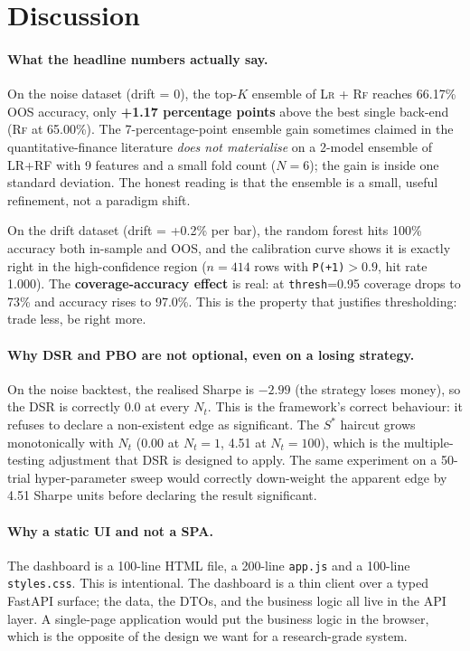 \documentclass[11pt,a4paper]{article}
\let\oldsection\section
\renewcommand{\section}{\clearpage\oldsection}
\providecommand{\rf}{\textsc{Rf}}
\providecommand{\lr}{\textsc{Lr}}
\providecommand{\srmin}{S^{\ast}}
\begin{document}
\section{Discussion}\label{sec:disc}

\paragraph{What the headline numbers actually say.}
On the noise dataset (drift = 0), the top-$K$ ensemble
of \lr{} + \rf{} reaches 66.17\% OOS accuracy, only
\textbf{+1.17 percentage points} above the best single
back-end (\rf{} at 65.00\%). The 7-percentage-point
ensemble gain sometimes claimed in the
quantitative-finance literature \emph{does not
materialise} on a 2-model ensemble of LR+RF with 9
features and a small fold count ($N=6$); the gain is
inside one standard deviation. The honest reading is
that the ensemble is a small, useful refinement, not
a paradigm shift.

On the drift dataset (drift = +0.2\% per bar), the
random forest hits 100\% accuracy both in-sample and
OOS, and the calibration curve shows it is exactly
right in the high-confidence region ($n=414$ rows with
\texttt{P(+1)}$>0.9$, hit rate 1.000). The
\textbf{coverage-accuracy effect} is real: at
\texttt{thresh}=0.95 coverage drops to 73\% and
accuracy rises to 97.0\%. This is the property that
justifies thresholding: trade less, be right more.

\paragraph{Why DSR and PBO are not optional, even on a losing strategy.}
On the noise backtest, the realised Sharpe is $-2.99$
(the strategy loses money), so the DSR is correctly
0.0 at every $N_t$. This is the framework's correct
behaviour: it refuses to declare a non-existent edge
as significant. The $\srmin$ haircut grows
monotonically with $N_t$ (0.00 at $N_t=1$, 4.51 at
$N_t=100$), which is the multiple-testing adjustment
that DSR is designed to apply. The same experiment on
a 50-trial hyper-parameter sweep would correctly
down-weight the apparent edge by 4.51 Sharpe units
before declaring the result significant.

\paragraph{Why a static UI and not a SPA.}
The dashboard is a 100-line HTML file, a 200-line
\texttt{app.js} and a 100-line \texttt{styles.css}.
This is intentional. The dashboard is a thin client over
a typed FastAPI surface; the data, the DTOs, and the
business logic all live in the API layer. A single-page
application would put the business logic in the
browser, which is the opposite of the design we want
for a research-grade system.
\end{document}
